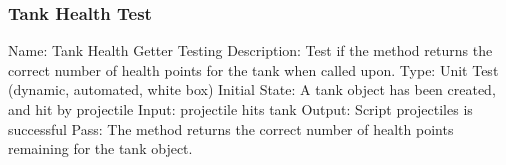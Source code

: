 \documentclass{article}
\begin{document}
\subsubsection{Tank Health Test}
Name: Tank Health Getter Testing\newline
Description: Test if the method returns the correct number of health points 
for the tank when called upon.\newline
Type: Unit Test (dynamic, automated, white box)\newline
Initial State: A tank object has been created, and hit by projectile\newline
Input: projectile hits tank\newline
Output: Script projectiles is successful  \newline
Pass: The method returns the correct number of health points remaining for the 
tank object.\newline






\end{document}
